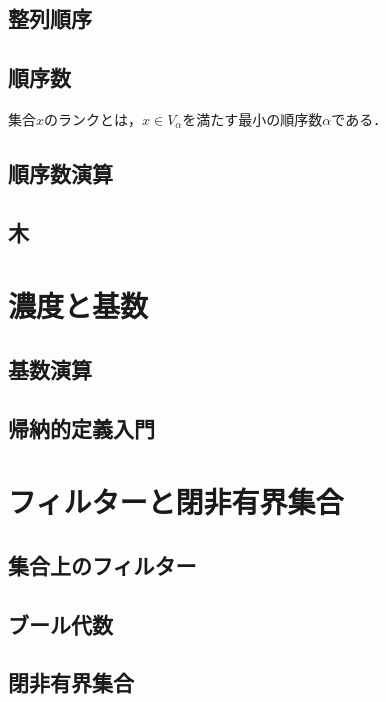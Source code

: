 \documentclass[uplatex, dvipdfmx]{jsreport}
\begin{document}
\subsection{整列順序}

\subsection{順序数}

\begin{definition}
    集合$x$のランクとは，$x\in V_\alpha$を満たす最小の順序数$\alpha$である．
\end{definition}

\subsection{順序数演算}

\subsection{木}

\section{濃度と基数}

\subsection{基数演算}

\subsection{帰納的定義入門}

\section{フィルターと閉非有界集合}

\subsection{集合上のフィルター}

\subsection{ブール代数}

\subsection{閉非有界集合}
\end{document}
